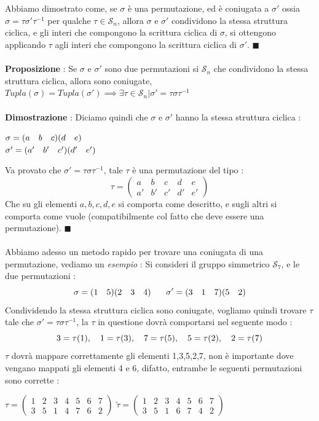 \documentclass[12pt, letterpaper]{article}
\newcommand{\Sn}{{\mathcal S_n}}
\newcommand{\spaz}{{\text{\hphantom{aa}}}}
\newcommand{\acc}{\\\hphantom{}\\}
\begin{document}
\acc
 Abbiamo dimostrato come, se \(\sigma\) è una permutazione, ed è coniugata a 
 \(\sigma'\) ossia \(\sigma=\tau\sigma'\tau^{-1}\)
 per qualche \(\tau\in\Sn\), allora \(\sigma\) e \(\sigma'\) condividono la stessa struttura ciclica, e gli interi 
 che compongono la scrittura ciclica di \(\sigma\), si ottengono applicando \(\tau\) agli interi 
 che compongono la scrittura ciclica di \(\sigma'\). \(\blacksquare\)\acc 
 \textbf{Proposizione} : Se \(\sigma\) e \(\sigma'\) sono due permutazioni si \(\Sn\) che condividono 
 la stessa struttura ciclica, allora sono coniugate, \(Tupla(\sigma)=Tupla(\sigma')\implies\exists\tau \in \Sn|\sigma' = \tau\sigma\tau^{-1}\)\acc 
 \textbf{Dimostrazione }: Diciamo quindi che \(\sigma\) e \(\sigma'\) hanno la stessa struttura ciclica :\begin{center}
    \(
    \sigma=(a\spaz b\spaz c)(d\spaz e) 
    \)\\\(\sigma'=(a'\spaz b'\spaz c')(d'\spaz e') \)
 \end{center}
 Va provato che \(\sigma' = \tau\sigma\tau^{-1}\), tale \(\tau\) è una permutazione del tipo : \begin{equation}
    \tau=\begin{pmatrix}
        a & b & c&d&e\\
        a'  & b' & c'&d'&e'
        \end{pmatrix}
 \end{equation}
 Che su gli elementi \(a,b,c,d,e\) si comporta come descritto, e sugli altri si comporta 
 come vuole (compatibilmente col fatto che deve essere una permutazione). \(\blacksquare\)\acc 
 Abbiamo adesso un metodo rapido per trovare una coniugata di una permutazione, vediamo un \textit{esempio} : 
 Si consideri il gruppo simmetrico \(\mathcal{S}_7\), e le due permutazioni : \begin{equation}
    \sigma = (1\spaz5)(2\spaz3\spaz4)\text{\hphantom{text}}\sigma' = (3\spaz1\spaz7)(5\spaz2)
 \end{equation}
 Condividendo la stessa struttura ciclica sono coniugate, vogliamo quindi trovare \(\tau\) tale che 
 \(\sigma' = \tau\sigma\tau^{-1}\), la \(\tau\) in questione dovrà comportarsi nel seguente modo :
 \begin{equation}
    3=\tau(1),\spaz1=\tau(3),\spaz7=\tau(5),\spaz5=\tau(2),\spaz2=\tau(7)
 \end{equation}
\(\tau\) dovrà mappare correttamente gli elementi 1,3,5,2,7, non è importante dove vengano 
mappati gli elementi 4 e 6, difatto, entrambe le seguenti permutazioni sono corrette : \begin{center}
    \(\tau=\begin{pmatrix}
        1 & 2 & 3&4&5&6&7\\
        3 & 5 & 1&4&7&6&2
        \end{pmatrix}\)\hphantom{aaaa}
        \(\tilde\tau=\begin{pmatrix}
            1 & 2 & 3&4&5&6&7\\
            3 & 5 & 1&6&7&4&2
            \end{pmatrix}\)
\end{center} 
\end{document}

